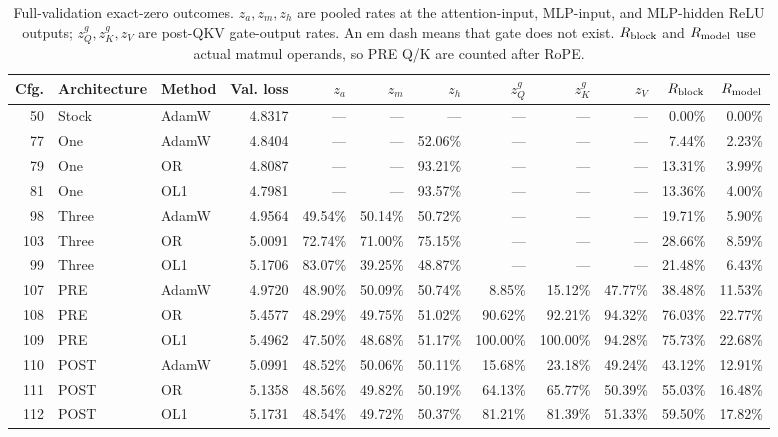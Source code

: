 \documentclass[10pt]{article}
\newcommand{\pct}{\%}
\begin{document}
\begin{landscape}
\begin{table}[H]
\centering
\caption{Full-validation exact-zero outcomes. $z_a,z_m,z_h$ are pooled rates at the attention-input, MLP-input, and MLP-hidden ReLU outputs; $z_Q^g,z_K^g,z_V$ are post-QKV gate-output rates. An em dash means that gate does not exist. $R_{\rm block}$ and $R_{\rm model}$ use actual matmul operands, so PRE Q/K are counted after RoPE.}
\label{tab:zeros}
\scriptsize
\setlength{\tabcolsep}{3.5pt}
\begin{tabular}{rllrrrrrrrrr}
\toprule
Cfg. & Architecture & Method & Val. loss & $z_a$ & $z_m$ & $z_h$ & $z_Q^g$ & $z_K^g$ & $z_V$ & $R_{\rm block}$ & $R_{\rm model}$ \\
\midrule
50  & Stock & AdamW & 4.8317 & --- & --- & --- & --- & --- & --- & 0.00\pct{} & 0.00\pct{} \\
77  & One & AdamW & 4.8404 & --- & --- & 52.06\pct{} & --- & --- & --- & 7.44\pct{} & 2.23\pct{} \\
79  & One & OR & 4.8087 & --- & --- & 93.21\pct{} & --- & --- & --- & 13.31\pct{} & 3.99\pct{} \\
81  & One & OL1 & 4.7981 & --- & --- & 93.57\pct{} & --- & --- & --- & 13.36\pct{} & 4.00\pct{} \\
98  & Three & AdamW & 4.9564 & 49.54\pct{} & 50.14\pct{} & 50.72\pct{} & --- & --- & --- & 19.71\pct{} & 5.90\pct{} \\
103 & Three & OR & 5.0091 & 72.74\pct{} & 71.00\pct{} & 75.15\pct{} & --- & --- & --- & 28.66\pct{} & 8.59\pct{} \\
99  & Three & OL1 & 5.1706 & 83.07\pct{} & 39.25\pct{} & 48.87\pct{} & --- & --- & --- & 21.48\pct{} & 6.43\pct{} \\
107 & PRE & AdamW & 4.9720 & 48.90\pct{} & 50.09\pct{} & 50.74\pct{} & 8.85\pct{} & 15.12\pct{} & 47.77\pct{} & 38.48\pct{} & 11.53\pct{} \\
108 & PRE & OR & 5.4577 & 48.29\pct{} & 49.75\pct{} & 51.02\pct{} & 90.62\pct{} & 92.21\pct{} & 94.32\pct{} & 76.03\pct{} & 22.77\pct{} \\
109 & PRE & OL1 & 5.4962 & 47.50\pct{} & 48.68\pct{} & 51.17\pct{} & 100.00\pct{} & 100.00\pct{} & 94.28\pct{} & 75.73\pct{} & 22.68\pct{} \\
110 & POST & AdamW & 5.0991 & 48.52\pct{} & 50.06\pct{} & 50.11\pct{} & 15.68\pct{} & 23.18\pct{} & 49.24\pct{} & 43.12\pct{} & 12.91\pct{} \\
111 & POST & OR & 5.1358 & 48.56\pct{} & 49.82\pct{} & 50.19\pct{} & 64.13\pct{} & 65.77\pct{} & 50.39\pct{} & 55.03\pct{} & 16.48\pct{} \\
112 & POST & OL1 & 5.1731 & 48.54\pct{} & 49.72\pct{} & 50.37\pct{} & 81.21\pct{} & 81.39\pct{} & 51.33\pct{} & 59.50\pct{} & 17.82\pct{} \\
\bottomrule
\end{tabular}
\end{table}
\end{landscape}
\end{document}
